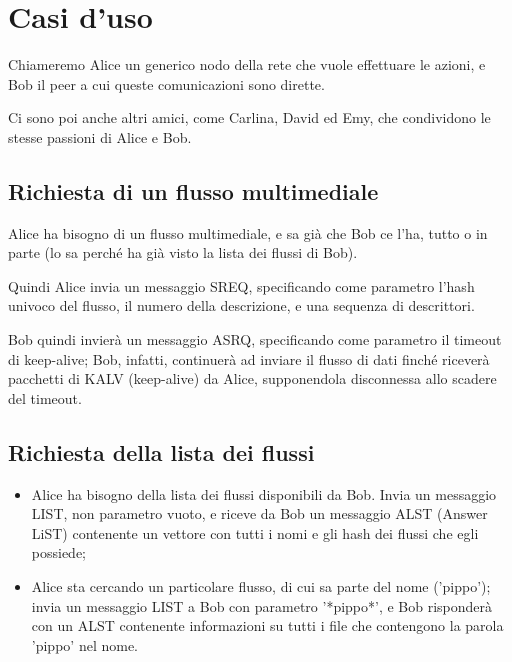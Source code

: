 \section{Casi d'uso}


Chiameremo Alice un generico nodo della rete che vuole effettuare le azioni, e Bob il peer a cui queste comunicazioni sono dirette.

Ci sono poi anche altri amici, come Carlina, David ed Emy, che condividono le stesse passioni di Alice e Bob.


\subsection{Richiesta di un flusso multimediale}
%

Alice ha bisogno di un flusso multimediale, e sa già che Bob ce l'ha, tutto o in parte (lo sa perché ha già visto la lista dei flussi di Bob).



Quindi Alice invia un messaggio SREQ, specificando come parametro l'hash univoco del flusso, il numero della descrizione, e una sequenza di descrittori.



Bob quindi invierà un messaggio ASRQ, specificando come parametro il timeout di keep-alive; Bob, infatti, continuerà ad inviare il flusso di dati finché riceverà pacchetti di KALV (keep-alive) da Alice, supponendola disconnessa allo scadere del timeout. 






\subsection{Richiesta della lista dei flussi}
%

\begin{itemize}
\item Alice ha bisogno della lista dei flussi disponibili da Bob. Invia un messaggio LIST, non parametro vuoto, e riceve da Bob un messaggio ALST (Answer LiST) contenente un vettore con tutti i nomi e gli hash dei flussi che egli possiede;

\item Alice sta cercando un particolare flusso, di cui sa parte del nome ('pippo'); invia un messaggio LIST a Bob con parametro '*pippo*', e Bob risponderà con un ALST contenente informazioni su tutti i file che contengono la parola 'pippo' nel nome.
\end{itemize}




